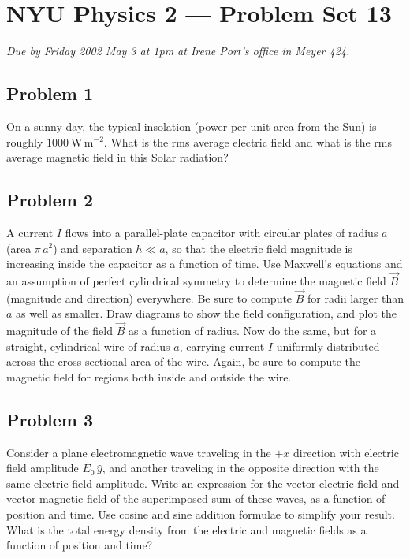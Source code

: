 \documentclass{article}
\begin{document}
\thispagestyle{empty}
\section*{NYU Physics 2 --- Problem Set 13}

\emph{Due by Friday 2002 May 3 at 1pm at Irene Port's office in
Meyer 424.}

\subsection*{Problem 1}

On a sunny day, the typical insolation (power per unit area from the
Sun) is roughly $1000~\mathrm{W\,m^{-2}}$.  What is the rms average
electric field and what is the rms average magnetic field in this
Solar radiation?

\subsection*{Problem 2}

A current $I$ flows into a parallel-plate capacitor with circular
plates of radius $a$ (area $\pi\,a^2$) and separation $h\ll a$, so
that the electric field magnitude is increasing inside the capacitor
as a function of time.  Use Maxwell's equations and an assumption of
perfect cylindrical symmetry to determine the magnetic field $\vec{B}$
(magnitude and direction) everywhere.  Be sure to compute $\vec{B}$
for radii larger than $a$ as well as smaller.  Draw diagrams to show
the field configuration, and plot the magnitude of the field $\vec{B}$
as a function of radius.  Now do the same, but for a straight,
cylindrical wire of radius $a$, carrying current $I$ uniformly
distributed across the cross-sectional area of the wire.  Again, be
sure to compute the magnetic field for regions both inside and outside
the wire.

\subsection*{Problem 3}

Consider a plane electromagnetic wave traveling in the $+x$ direction
with electric field amplitude $E_0\,\hat{y}$, and another traveling in
the opposite direction with the same electric field amplitude.  Write
an expression for the vector electric field and vector magnetic field
of the superimposed sum of these waves, as a function of position and
time.  Use cosine and sine addition formulae to simplify your result.
What is the total energy density from the electric and magnetic fields
as a function of position and time?
\end{document}
